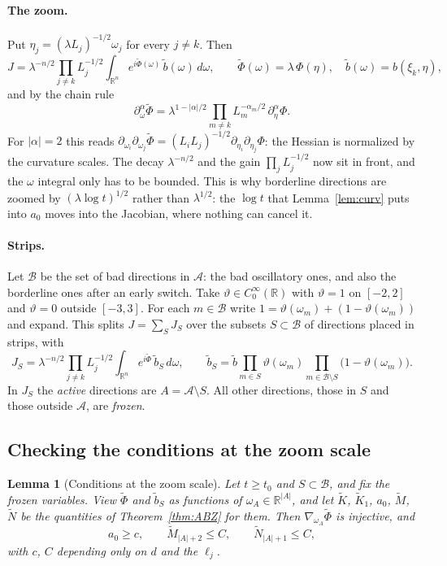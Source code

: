 \documentclass[11pt]{article}
\newtheorem{lemma}[theorem]{Lemma}
\theoremstyle{remark}
\newcommand{\R}{\mathbb{R}}
\begin{document}
\paragraph{The zoom.} Put $\eta_j=(\lambda L_j)^{-1/2}\omega_j$ for every $j\ne k$.
Then
\[
J=\lambda^{-n/2}\prod_{j\ne k}L_j^{-1/2}\int_{\R^n}e^{i\tilde\Phi(\omega)}\,\tilde b(\omega)\,d\omega ,
\qquad
\tilde\Phi(\omega)=\lambda\,\Phi(\eta),
\quad
\tilde b(\omega)=b(\xi_k,\eta),
\]
and by the chain rule
\[
\partial_\omega^\alpha\tilde\Phi=\lambda^{1-|\alpha|/2}\prod_{m\ne k}L_m^{-\alpha_m/2}\,
\partial_\eta^\alpha\Phi .
\]
For $|\alpha|=2$ this reads
$\partial_{\omega_i}\partial_{\omega_j}\tilde\Phi=(L_iL_j)^{-1/2}\partial_{\eta_i}\partial_{\eta_j}\Phi$:
the Hessian is normalized by the curvature scales. The decay $\lambda^{-n/2}$ and the
gain $\prod_jL_j^{-1/2}$ now sit in front, and the $\omega$ integral only has to be
bounded. This is why borderline directions are zoomed by $(\lambda\log t)^{1/2}$
rather than $\lambda^{1/2}$: the $\log t$ that Lemma~\ref{lem:curv} puts into $a_0$
moves into the Jacobian, where nothing can cancel it.

\paragraph{Strips.} Let $\mathcal B$ be the set of bad directions in $\mathcal A$:
the bad oscillatory ones, and also the borderline ones after an early switch. Take
$\vartheta\in C_0^\infty(\R)$ with $\vartheta=1$ on $[-2,2]$ and $\vartheta=0$
outside $[-3,3]$. For each $m\in\mathcal B$ write
$1=\vartheta(\omega_m)+(1-\vartheta(\omega_m))$ and expand. This splits
$J=\sum_SJ_S$ over the subsets $S\subset\mathcal B$ of directions placed in strips,
with
\[
J_S=\lambda^{-n/2}\prod_{j\ne k}L_j^{-1/2}\int_{\R^n}e^{i\tilde\Phi}\,\tilde b_S\,d\omega ,
\qquad
\tilde b_S=\tilde b\prod_{m\in S}\vartheta(\omega_m)\prod_{m\in\mathcal B\setminus S}\big(1-\vartheta(\omega_m)\big).
\]
In $J_S$ the \emph{active} directions are $A=\mathcal A\setminus S$. All other
directions, those in $S$ and those outside $\mathcal A$, are \emph{frozen}.

\subsection{Checking the conditions at the zoom scale}

\begin{lemma}[Conditions at the zoom scale]\label{lem:zoomcheck}
	Let $t\ge t_0$ and $S\subset\mathcal B$, and fix the frozen variables. View
	$\tilde\Phi$ and $\tilde b_S$ as functions of $\omega_A\in\R^{|A|}$, and let
	$\tilde K$, $\tilde K_1$, $a_0$, $\tilde M$, $\tilde N$ be the quantities of
	Theorem~\ref{thm:ABZ} for them. Then $\nabla_{\omega_A}\tilde\Phi$ is injective,
	and
	\[
	a_0\ge c,\qquad \tilde M_{|A|+2}\le C,\qquad \tilde N_{|A|+1}\le C,
	\]
	with $c$, $C$ depending only on $d$ and the $\ell_j$.
\end{lemma}
\end{document}
